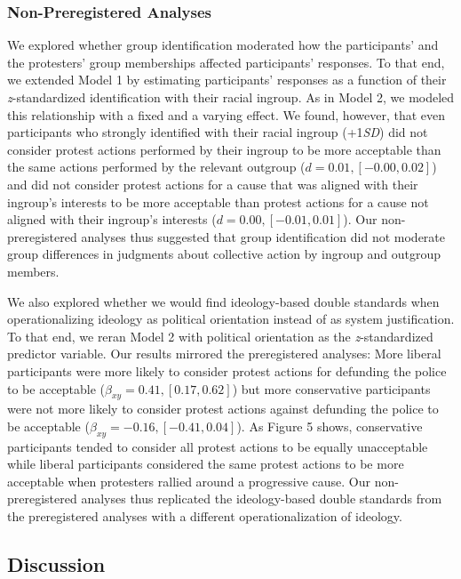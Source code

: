 \documentclass[12pt, letterpaper]{article}
\begin{document}
\hypertarget{non-preregistered-analyses-1}{%
\subsubsection{Non-Preregistered
Analyses}\label{non-preregistered-analyses-1}}

We explored whether group identification moderated how the participants'
and the protesters' group memberships affected participants' responses.
To that end, we extended Model 1 by estimating participants' responses
as a function of their \emph{z}-standardized identification with their
racial ingroup. As in Model 2, we modeled this relationship with a fixed
and a varying effect. We found, however, that even participants who
strongly identified with their racial ingroup (+1\emph{SD}) did not
consider protest actions performed by their ingroup to be more
acceptable than the same actions performed by the relevant outgroup
(\(d = 0.01, [-0.00, 0.02]\)) and did not consider protest actions for a
cause that was aligned with their ingroup's interests to be more
acceptable than protest actions for a cause not aligned with their
ingroup's interests (\(d = 0.00, [-0.01, 0.01]\)). Our non-preregistered
analyses thus suggested that group identification did not moderate group
differences in judgments about collective action by ingroup and outgroup
members.

We also explored whether we would find ideology-based double standards
when operationalizing ideology as political orientation instead of as
system justification. To that end, we reran Model 2 with political
orientation as the \emph{z}-standardized predictor variable. Our results
mirrored the preregistered analyses: More liberal participants were more
likely to consider protest actions for defunding the police to be
acceptable (\(\beta_{xy} = 0.41, [0.17, 0.62]\)) but more conservative
participants were not more likely to consider protest actions against
defunding the police to be acceptable
(\(\beta_{xy} = -0.16, [-0.41, 0.04]\)). As Figure 5 shows, conservative
participants tended to consider all protest actions to be equally
unacceptable while liberal participants considered the same protest
actions to be more acceptable when protesters rallied around a
progressive cause. Our non-preregistered analyses thus replicated the
ideology-based double standards from the preregistered analyses with a
different operationalization of ideology.

\hypertarget{discussion-1}{%
\subsection{Discussion}\label{discussion-1}}
\end{document}
